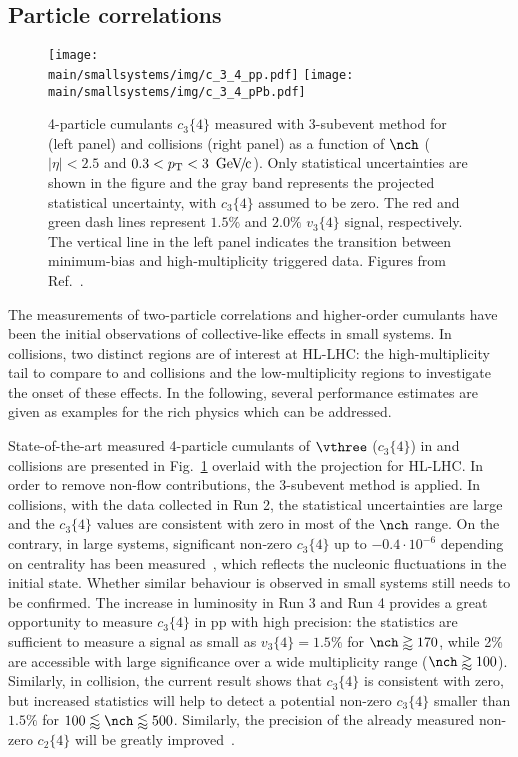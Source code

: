 \documentclass[../report.tex]{subfiles}
\providecommand{\main}{..}
\begin{document}
\subsection{Particle correlations}
\label{sect:smallsystems_correlations}

\begin{figure}[t]
\centering
\texttt{[image: \\main/smallsystems/img/c\_3\_4\_pp.pdf]}
\hfill
\texttt{[image: \\main/smallsystems/img/c\_3\_4\_pPb.pdf]}
\caption{4-particle cumulants $c_3\{4\}$ measured with 3-subevent method for \pp (left panel) and \pPb collisions (right panel) as a function of $\nch$ ($|\eta| < 2.5$ and $0.3 < \pT < \unit[3]{\UGeVc}$). Only statistical uncertainties are shown in the figure and the gray band represents the projected statistical uncertainty, with $c_3\{4\}$ assumed to be zero. The red and green dash lines represent $1.5\%$ and $2.0\%$ $v_3\{4\}$ signal, respectively. The vertical line in the left panel indicates the transition between minimum-bias and high-multiplicity triggered data. Figures from Ref.~\cite{ATL-PHYS-PUB-2018-020}.}
\label{fig:smallsystems_corr_cumulants}
\end{figure}

The measurements of two-particle correlations and higher-order cumulants have been the initial observations of collective-like effects in small systems. In \pp collisions, two distinct regions are of interest at HL-LHC: the high-multiplicity tail to compare to \pPb and \PbPb collisions and the low-multiplicity regions to investigate the onset of these effects. In the following, several performance estimates are given as examples for the rich physics which can be addressed.

State-of-the-art measured 4-particle cumulants of $\vthree$ ($c_3\{4\}$) in \pp and \pPb collisions are presented in Fig.~\ref{fig:smallsystems_corr_cumulants} overlaid with the projection for HL-LHC.
In order to remove non-flow contributions, the 3-subevent method is applied. In \pp collisions, with the data collected in Run 2, the statistical uncertainties are large and the $c_3\{4\}$ values are consistent with zero in most of the $\nch$ range. On the contrary, in large systems, significant non-zero $c_3\{4\}$ up to $-0.4 \cdot 10^{-6}$ depending on centrality has been measured~\cite{Aad:2014vba}, which reflects the nucleonic fluctuations in the initial state. Whether similar behaviour is observed in small systems still needs to be confirmed. The increase in luminosity in Run 3 and Run 4 provides a great opportunity to measure $c_3\{4\}$ in pp with high precision: the statistics are sufficient to measure a signal as small as $v_3\{4\} = 1.5\%$ for $\nch \gtrapprox 170$, while 2\% are accessible with large significance over a wide multiplicity range ($\nch \gtrapprox 100$). Similarly, in \pPb collision, the current result shows that $c_3\{4\}$ is consistent with zero, but increased statistics will help to detect a potential non-zero $c_3\{4\}$ smaller than $1.5\%$ for $100 \lessapprox \nch \lessapprox 500$. Similarly, the precision of the already measured non-zero $c_2\{4\}$ will be greatly improved~\cite{ATL-PHYS-PUB-2018-020}.
\end{document}
